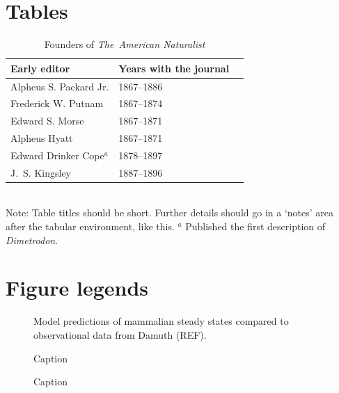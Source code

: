 \documentclass[11pt]{article}
\begin{document}

\newpage{}

\section*{Tables}
\renewcommand{\thetable}{\arabic{table}}
\setcounter{table}{0}

\begin{table}[h]
\caption{Founders of \textit{The~American Naturalist}}
\label{Table:Founders}
\centering
\begin{tabular}{lll}\hline
Early editor            & Years with the journal \\ \hline
Alpheus S. Packard Jr.  & 1867--1886 \\
Frederick W. Putnam     & 1867--1874 \\ 
Edward S. Morse         & 1867--1871 \\ 
Alpheus Hyatt           & 1867--1871 \\
Edward Drinker Cope$^a$ & 1878--1897 \\
J.~S. Kingsley          & 1887--1896 \\ \hline 
\end{tabular}
\bigskip{}
\\
{\footnotesize Note: Table titles should be short. Further details should go in a `notes' area after the tabular environment, like this. $^a$ Published the first description of \textit{Dimetrodon}.}
\end{table}

\newpage{}

\section*{Figure legends}

\begin{figure}[h!]
\caption{Model predictions of mammalian steady states compared to observational data from Damuth (REF).}
\label{fig:2ddensities}
\end{figure}


\begin{figure}[h!]
    \caption{Caption}
    \label{fig:starve}
\end{figure}


\begin{figure}[h!]
    \caption{Caption}
    \label{fig:naturalmort}
\end{figure}
\end{document}
